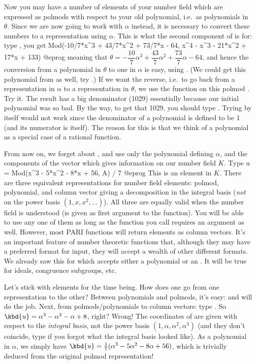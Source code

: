 Now you may have a number of elements of your number field which are
expressed as polmods with respect to your old polynomial, i.e.~as polynomials
in $\theta$. Since we are now going to work with $\alpha$ instead, it is
necessary to convert these numbers to a representation using $\alpha$. This
is what the second component of  is for: type , you get
\bprog
  Mod(-10/7*x^3 + 43/7*x^2 + 73/7*x - 64, x^4 - x^3 - 21*x^2 + 17*x + 133)
@eprog\noindent
meaning that $\theta =
-\dfrac{10}{7}\alpha^3+\dfrac{43}{7}\alpha^2+\dfrac{73}{7}\alpha-64$, and hence the conversion from a
polynomial in $\theta$ to one in $\alpha$ is easy, using . (We
could get this polynomial from  as well, try .)
If we want the reverse, i.e.~to go back from a representation in $\alpha$ to
a representation in $\theta$, we use the function  on this
polmod . Try it. The result has a big denominator (1029) essentially
because our initial polynomial  was so bad. By the way, to get that
1029,
you should type . Trying  by
itself would not work since the denominator of a polynomial is defined to be
1 (and its numerator is itself). The reason for this is that we think of a
polynomial as a special case of a rational function.\smallskip

From now on, we forget about , and use only the polynomial
 defining $\alpha$, and the components of the vector  which
gives information on our number field $K$. Type
\bprog
  u = Mod(x^3 - 5*x^2 - 8*x + 56, A) / 7
@eprog\noindent
This is an element in $K$. There are three equivalent
representations for number field elements: polmod, polynomial, and column
vector giving a decomposition in the integral basis  (\emph{not} on
the power basis $(1,x,x^2,\dots)$). All three are equally valid when the
number field is understood (is given as first argument to the function).
You will be able to use any one of them as long as the function you call
requires an  argument as well. However, most PARI functions will
return elements as column vectors. It's an important feature of number
theoretic functions that, although they may have a preferred format for
input, they will accept a wealth of other different formats. We already saw
this for  which accepts either a polynomial or an . It
will be true for ideals, congruence subgroups, etc.

  Let's stick with elements for the time being. How does one go from one
representation to the other? Between polynomials and polmods, it's easy:
 and  will do the job. Next, from polmods/polynomials to
column vectors: type . So $\kbd{u} = \alpha^3-
\alpha^2 - \alpha + 8$, right? Wrong! The coordinates of  are given
with respect to the \emph{integral basis}, not the power basis
$(1,\alpha,\alpha^2,\alpha^3)$ (and they don't coincide, type  if
you forgot what the integral basis looked like). As a polynomial in $\alpha$,
we simply have $\kbd{u} = {1\over7}(\alpha^3 - 5\alpha^2-8\alpha+56)$, which
is trivially deduced from the original polmod representation!

